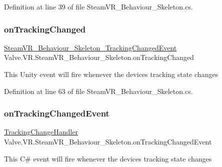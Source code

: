 Definition at line 39 of file Steam\+V\+R\+\_\+\+Behaviour\+\_\+\+Skeleton.\+cs.

\mbox{\label{class_valve_1_1_v_r_1_1_steam_v_r___behaviour___skeleton_afcbb0bb75e8797c87767fcf0eb4c4884}} 
\subsubsection{\texorpdfstring{onTrackingChanged}{onTrackingChanged}}
{\footnotesize\ttfamily \mbox{\hyperlink{class_valve_1_1_v_r_1_1_steam_v_r___behaviour___skeleton___tracking_changed_event}{Steam\+V\+R\+\_\+\+Behaviour\+\_\+\+Skeleton\+\_\+\+Tracking\+Changed\+Event}} Valve.\+V\+R.\+Steam\+V\+R\+\_\+\+Behaviour\+\_\+\+Skeleton.\+on\+Tracking\+Changed}



This Unity event will fire whenever the device\textquotesingle{}s tracking state changes 



Definition at line 63 of file Steam\+V\+R\+\_\+\+Behaviour\+\_\+\+Skeleton.\+cs.

\mbox{\label{class_valve_1_1_v_r_1_1_steam_v_r___behaviour___skeleton_a1a307b208ac7ada02ea92e0734160290}} 
\subsubsection{\texorpdfstring{onTrackingChangedEvent}{onTrackingChangedEvent}}
{\footnotesize\ttfamily \mbox{\hyperlink{class_valve_1_1_v_r_1_1_steam_v_r___behaviour___skeleton_a473b611af60d6c89ba50e62833c23cd8}{Tracking\+Change\+Handler}} Valve.\+V\+R.\+Steam\+V\+R\+\_\+\+Behaviour\+\_\+\+Skeleton.\+on\+Tracking\+Changed\+Event}



This C\# event will fire whenever the device\textquotesingle{}s tracking state changes 



